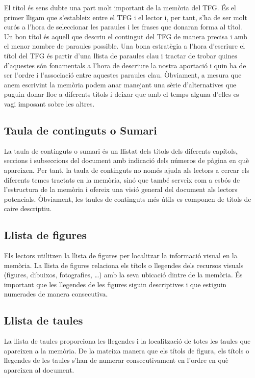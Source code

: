El títol és sens dubte una part molt important de la memòria del \ac{TFG}. És el primer lligam que s'estableix entre el \ac{TFG} i el lector i, per tant, s'ha de ser molt curós a l'hora de seleccionar les paraules i les frases que donaran forma al títol. Un bon títol és aquell que descriu el contingut del \ac{TFG} de manera precisa i amb el menor nombre de paraules possible. Una bona estratègia a l'hora d'escriure el títol del \ac{TFG} és partir d'una llista de paraules clau i tractar de trobar quines d'aquestes són fonamentals a l'hora de descriure la nostra aportació i quin ha de ser l'ordre i l'associació entre aquestes paraules clau. Òbviament, a mesura que anem escrivint la memòria podem anar manejant una sèrie d'alternatives que puguin donar lloc a diferents títols i deixar que amb el temps alguna d'elles es vagi imposant sobre les altres.

\subsection{Taula de continguts o Sumari}

La taula de continguts o sumari és un llistat dels títols dels diferents capítols, seccions i subseccions del document amb indicació dels números de pàgina en què apareixen. Per tant, la taula de continguts no només ajuda als lectors a cercar els diferents temes tractats en la memòria, sinó que també serveix com a esbós de l'estructura de la memòria i ofereix una visió general del document als lectors potencials. Òbviament, les taules de continguts més útils es componen de títols de caire descriptiu.

\subsection{Llista de figures}

Els lectors utilitzen la llista de figures per localitzar la informació visual en la memòria. La llista de figures relaciona els títols o llegendes dels recursos visuals (figures, dibuixos, fotografies, \ldots) amb la seva ubicació dintre de la memòria. És important que les llegendes de les figures siguin descriptives i que estiguin numerades de manera consecutiva.

\subsection{Llista de taules}

La llista de taules proporciona les llegendes i la localització de totes les taules que apareixen a la memòria. De la mateixa manera que els títols de figura, els títols o llegendes de les taules s'han de numerar consecutivament en l'ordre en què apareixen al document.

